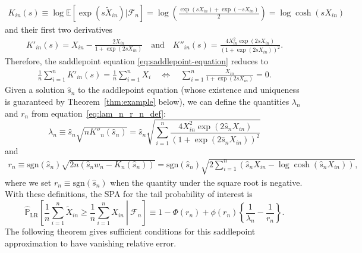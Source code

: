 \documentclass[12pt]{article}
\theoremstyle{definition}
\def\P{\mathbb{P}}
\def\sgn{\mathrm{sgn}}
\def\P{\mathbb{P}}
\newcommand{\E}{\mathbb E}								%
\renewcommand{\P}{\mathbb{P}}							%
\begin{document}
\begin{align*}
	K_{in}(s)\equiv \log\E\left[\exp(s\widetilde{X}_{in})|\mathcal{F}_n\right]=\log\left(\frac{\exp(sX_{in}) + \exp(-sX_{in})}{2}\right) = \log\cosh(sX_{in})
\end{align*}
and their first two derivatives
\begin{align}\label{eq:tilde_K_in_prime}
	K'_{in}(s)=X_{in}-\frac{2X_{in}}{1+\exp(2sX_{in})} \quad \text{and} \quad K''_{in}(s)=\frac{4X_{in}^2\exp(2sX_{in})}{(1+\exp(2sX_{in}))^2}.
\end{align}
Therefore, the saddlepoint equation \eqref{eq:saddlepoint-equation} reduces to
\begin{align}\label{eq:saddlepoint_equation_example_simplified}
\frac{1}{n}\sum_{i = 1}^n K'_{in}(s) = \frac{1}{n}\sum_{i = 1}^n X_i \quad \Longleftrightarrow \quad \sum_{i=1}^n \frac{X_{in}}{1+\exp(2sX_{in})}=0.
\end{align}
Given a solution $\hat s_n$ to the saddlepoint equation (whose existence and uniqueness is guaranteed by Theorem~\ref{thm:example} below), we can define the quantities $\lambda_n$ and $r_n$ from equation~\eqref{eq:lam_n_r_n_def}:
\begin{equation}
\lambda_n \equiv \hat s_n \sqrt{n K''_{n}(\hat s_n)} = \hat s_n\sqrt{\sum_{i=1}^n\frac{4X_{in}^2\exp(2\hat s_nX_{in})}{(1+\exp(2\hat s_nX_{in}))^2}}
\label{eq:lambda_n_sign_flipping}
\end{equation}
and
\begin{equation}
\begin{split}
r_n \equiv \sgn(\hat s_n) \sqrt{2n( \hat s_n w_n - K_n(\hat s_n))} = \sgn(\hat s_n) \sqrt{2\sum_{i=1}^n (\hat s_n X_{in} - \log \cosh(\hat s_n X_{in}))},
\label{eq:r_n_sign_flipping}
\end{split}
\end{equation}
where we set $r_n \equiv \sgn(\hat s_n)$ when the quantity under the square root is negative. With these definitions, the SPA for the tail probability of interest is
\begin{equation}
\widehat{\P}_{\text{LR}} \left[\left.\frac{1}{n}\sum_{i=1}^n \widetilde{X}_{in} \geq \frac{1}{n}\sum_{i=1}^n X_{in}\ \right|\ \mathcal{F}_n\right] \equiv 1-\Phi(r_n)+\phi(r_n)\left\{\frac{1}{\lambda_n}-\frac{1}{r_n}\right\}.
\label{eq:sign-flipping-spa}
\end{equation} 
The following theorem gives sufficient conditions for this saddlepoint approximation to have vanishing relative error.
\end{document}
